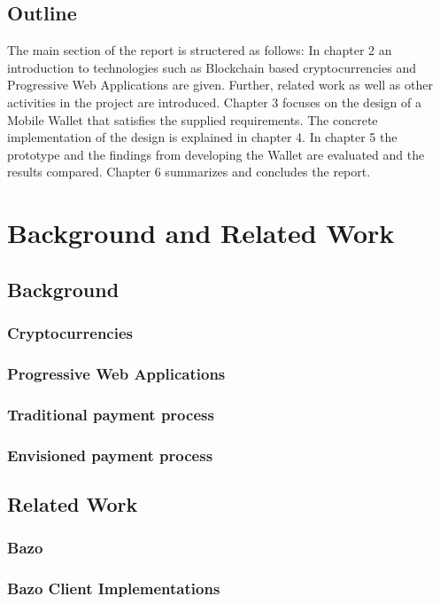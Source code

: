 \documentclass[a4paper]{article}
\begin{document}
\subsection{Outline}
The main section of the report is structered as follows:
In chapter 2 an introduction to technologies such as Blockchain based cryptocurrencies and Progressive Web Applications are given. Further, related work  as well as other activities in the project are introduced. Chapter 3 focuses on the design of a Mobile Wallet that satisfies the supplied requirements. The concrete implementation of the design is explained in chapter 4. In chapter 5 the prototype and the findings from developing the Wallet are evaluated and the results compared.
Chapter 6 summarizes and concludes the report.
\newpage

\section{Background and Related Work}
\subsection{Background}
\subsubsection{Cryptocurrencies}
\subsubsection{Progressive Web Applications}
\subsubsection{Traditional payment process}
\subsubsection{Envisioned payment process}


\subsection{Related Work}
\subsubsection{Bazo}
\subsubsection{Bazo Client Implementations}
\end{document}
